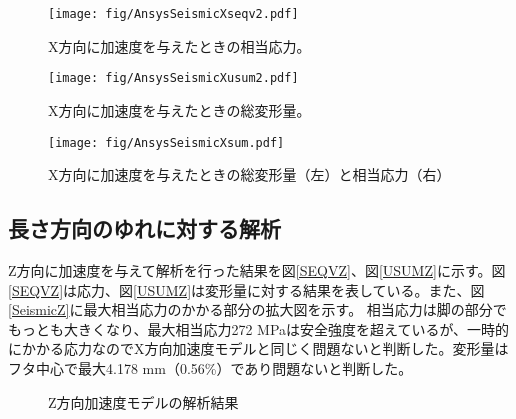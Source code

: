 \documentclass[11pt]{jreport}
\newcommand{\figref}[1]{図\ref{#1}}
\begin{document}
\begin{figure}[htbp]
\begin{minipage}{0.47\textwidth}
\centering
\texttt{[image: fig/AnsysSeismicXseqv2.pdf]}
\caption[X方向に加速度を与えたときの相当応力]{X方向に加速度を与えたときの相当応力。}
\label{SEQVX}
\end{minipage}
\hfill
\begin{minipage}{0.47\textwidth}
\centering
\texttt{[image: fig/AnsysSeismicXusum2.pdf]}
\caption[X方向に加速度を与えたときの総変形量]{X方向に加速度を与えたときの総変形量。}
\label{USUMX}
\end{minipage}
\end{figure}
\fi%

\begin{figure}[htbp]
\centering
\texttt{[image: fig/AnsysSeismicXsum.pdf]}
\caption[X方向に加速度を与えたときの総変形量と相当応力]{X方向に加速度を与えたときの総変形量（左）と相当応力（右）}
\label{SeismicX}
\end{figure}


\subsection{長さ方向のゆれに対する解析}

Z方向に加速度を与えて解析を行った結果を\figref{SEQVZ}、\figref{USUMZ}に示す。\figref{SEQVZ}は応力、\figref{USUMZ}は変形量に対する結果を表している。また、\figref{SeismicZ}に最大相当応力のかかる部分の拡大図を示す。
相当応力は脚の部分でもっとも大きくなり、最大相当応力272 MPaは安全強度を超えているが、一時的にかかる応力なのでX方向加速度モデルと同じく問題ないと判断した。変形量はフタ中心で最大4.178 mm（0.56\%）であり問題ないと判断した。

\begin{figure}[htbp]
  \begin{minipage}{0.47\textwidth}
  \end{minipage}
  \hfill
  \begin{minipage}{0.47\textwidth}
  \end{minipage}
    \caption{Z方向加速度モデルの解析結果}
  \label{Zmatome}
\end{figure}
\end{document}
